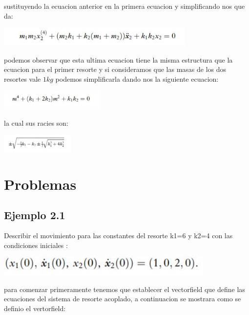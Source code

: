 \documentclass{article}
\begin{document}
sustituyendo la ecuacion anterior en la primera ecuacion y simplificando nos que da:

\begin{center}
\includegraphics[height=1cm]{ec5.png}
\end{center}

podemos observar que esta ultima ecuacion tiene la misma estructura que la ecuacion para el primer resorte y si consideramos que las masas de los dos resortes vale $1kg$ podemos simplificarla dando nos la siguiente ecuacion:
 
 
\begin{center}
\includegraphics[height=1cm]{ec6.png}
\end{center}

la cual sus racies son:

\begin{center}
\includegraphics[height=1cm]{ec7.png}
\end{center}

\section{Problemas}
\vspace{0.05cm}
\subsection{Ejemplo 2.1}

Describir el movimiento para las constantes del resorte k1=6 y k2=4 con las condiciones iniciales :

\begin{center}
\includegraphics[height=1cm]{ec8.png}
\end{center}

para comenzar primeramente tenemos que establecer el vectorfield que define las ecuaciones del sistema de resorte acoplado, a continuacion se mostrara como se definio el vertorfield:
\end{document}

